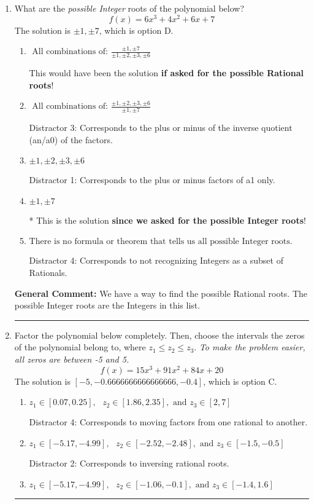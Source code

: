 \documentclass{extbook}[14pt]
\newcommand{\litem}[1]{\item #1

\rule{\textwidth}{0.4pt}}
\begin{document}
\begin{enumerate}\litem{
What are the \textit{possible Integer} roots of the polynomial below?
\[ f(x) = 6x^{3} +4 x^{2} +6 x + 7 \]The solution is \( \pm 1,\pm 7 \), which is option D.\begin{enumerate}[label=\Alph*.]
\item \( \text{ All combinations of: }\frac{\pm 1,\pm 7}{\pm 1,\pm 2,\pm 3,\pm 6} \)

This would have been the solution \textbf{if asked for the possible Rational roots}!
\item \( \text{ All combinations of: }\frac{\pm 1,\pm 2,\pm 3,\pm 6}{\pm 1,\pm 7} \)

 Distractor 3: Corresponds to the plus or minus of the inverse quotient (an/a0) of the factors. 
\item \( \pm 1,\pm 2,\pm 3,\pm 6 \)

 Distractor 1: Corresponds to the plus or minus factors of a1 only.
\item \( \pm 1,\pm 7 \)

* This is the solution \textbf{since we asked for the possible Integer roots}!
\item \( \text{There is no formula or theorem that tells us all possible Integer roots.} \)

 Distractor 4: Corresponds to not recognizing Integers as a subset of Rationals.
\end{enumerate}

\textbf{General Comment:} We have a way to find the possible Rational roots. The possible Integer roots are the Integers in this list.
}
\litem{
Factor the polynomial below completely. Then, choose the intervals the zeros of the polynomial belong to, where $z_1 \leq z_2 \leq z_3$. \textit{To make the problem easier, all zeros are between -5 and 5.}
\[ f(x) = 15x^{3} +91 x^{2} +84 x + 20 \]The solution is \( [-5, -0.6666666666666666, -0.4] \), which is option C.\begin{enumerate}[label=\Alph*.]
\item \( z_1 \in [0.07, 0.25], \text{   }  z_2 \in [1.86, 2.35], \text{   and   } z_3 \in [2, 7] \)

 Distractor 4: Corresponds to moving factors from one rational to another.
\item \( z_1 \in [-5.17, -4.99], \text{   }  z_2 \in [-2.52, -2.48], \text{   and   } z_3 \in [-1.5, -0.5] \)

 Distractor 2: Corresponds to inversing rational roots.
\item \( z_1 \in [-5.17, -4.99], \text{   }  z_2 \in [-1.06, -0.1], \text{   and   } z_3 \in [-1.4, 1.6] \)


\end{enumerate}}
\end{enumerate}
\end{document}
